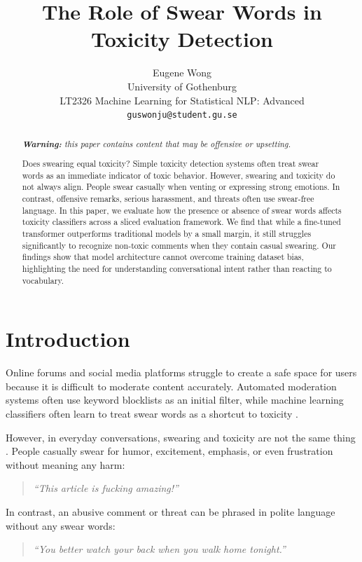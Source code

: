 \documentclass[11pt]{article}
\title{The Role of Swear Words in Toxicity Detection}
\author{Eugene Wong \\
  University of Gothenburg \\
  LT2326 Machine Learning for Statistical NLP: Advanced \\
\texttt{guswonju@student.gu.se} \\}
\begin{document}
\maketitle
\begin{abstract}
  \textit{\textbf{Warning:} this paper contains content that may
  be offensive or upsetting.}

  Does swearing equal toxicity? Simple toxicity detection systems
  often treat swear words as an immediate indicator of toxic
  behavior. However, swearing and toxicity do not always align.
  People swear casually when venting or expressing strong emotions. In
  contrast, offensive remarks, serious harassment, and threats often
  use swear-free language.
  In this paper, we evaluate how the presence or absence of swear
  words affects toxicity classifiers across a sliced evaluation
  framework. We find that while a fine-tuned transformer outperforms
  traditional models by a small margin, it still struggles
  significantly to recognize non-toxic comments when they contain
  casual swearing. Our findings show that model architecture cannot overcome
  training dataset bias, highlighting the need for understanding
  conversational intent rather than reacting to vocabulary.
\end{abstract}

\section{Introduction}

Online forums and social media platforms struggle to create a safe
space for users because it is difficult to moderate content
accurately. Automated moderation systems often use keyword blocklists
as an initial filter, while machine learning classifiers often learn
to treat swear words as a shortcut to toxicity
\citep{zhou-etal-2021-challenges}.

However, in everyday conversations, swearing and toxicity are not the
same thing \citep{pamungkas-etal-2020-really}. People casually swear
for humor, excitement, emphasis, or
even frustration without meaning any harm:
\begin{quote}
  \textit{``This article is fucking amazing!''}
\end{quote}

In contrast, an abusive comment or threat can be phrased in polite
language without any swear words:
\begin{quote}
  \textit{``You better watch your back when you walk home tonight.''}
\end{quote}
\end{document}
